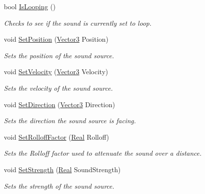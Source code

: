 \begin{DoxyCompactItemize}
bool \hyperlink{classphys_1_1Sound_a67f4a5475bc634c8ee894933cc09f933}{IsLooping} ()
\begin{DoxyCompactList}\small\item\em Checks to see if the sound is currently set to loop. \item\end{DoxyCompactList}\item 
void \hyperlink{classphys_1_1Sound_a245bc4d760bcf30e9520aee00cf40c61}{SetPosition} (\hyperlink{classphys_1_1Vector3}{Vector3} Position)
\begin{DoxyCompactList}\small\item\em Sets the position of the sound source. \item\end{DoxyCompactList}\item 
void \hyperlink{classphys_1_1Sound_a673a0ab44fa32fdcd15180e813b7b02b}{SetVelocity} (\hyperlink{classphys_1_1Vector3}{Vector3} Velocity)
\begin{DoxyCompactList}\small\item\em Sets the velocity of the sound source. \item\end{DoxyCompactList}\item 
void \hyperlink{classphys_1_1Sound_af2d6aa7e1b3b2e9f60b8dbbe8aa2d381}{SetDirection} (\hyperlink{classphys_1_1Vector3}{Vector3} Direction)
\begin{DoxyCompactList}\small\item\em Sets the direction the sound source is facing. \item\end{DoxyCompactList}\item 
void \hyperlink{classphys_1_1Sound_a56e657013dc4d561dbc3b0c5d12d542d}{SetRolloffFactor} (\hyperlink{namespacephys_af7eb897198d265b8e868f45240230d5f}{Real} Rolloff)
\begin{DoxyCompactList}\small\item\em Sets the Rolloff factor used to attenuate the sound over a distance. \item\end{DoxyCompactList}\item 
void \hyperlink{classphys_1_1Sound_a44d6c066fad6f09553e47892a14bf5ef}{SetStrength} (\hyperlink{namespacephys_af7eb897198d265b8e868f45240230d5f}{Real} SoundStrength)
\begin{DoxyCompactList}\small\item\em Sets the strength of the sound source. \item\end{DoxyCompactList}\item 

\end{DoxyCompactItemize}
